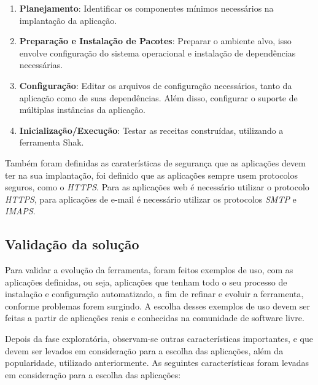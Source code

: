 \begin{enumerate}
  \item  \textbf{Planejamento}: Identificar os componentes mínimos necessários na implantação
 da aplicação.  
  \item  \textbf{Preparação e Instalação de Pacotes}: Preparar o ambiente alvo, 
isso envolve configuração do sistema operacional e instalação de dependências necessárias.
  \item  \textbf{Configuração}: Editar os arquivos de configuração necessários, tanto 
da aplicação como de suas dependências. Além disso, configurar o suporte de múltiplas instâncias
da aplicação.   
  \item  \textbf{Inicialização/Execução}: Testar as receitas construídas, utilizando
a ferramenta Shak. 
\end{enumerate}

Também foram definidas as caraterísticas de segurança que as aplicações devem 
ter na  sua implantação, foi 
definido que as aplicações sempre usem protocolos 
seguros, como o \textit{HTTPS}. 
Para as aplicações web é necessário utilizar o protocolo \textit{HTTPS}, para aplicações
de e-mail é necessário utilizar os protocolos \textit{SMTP} e \textit{IMAPS}.

\subsection{Validação da solução}
\label{subsection:validacao}

Para validar a evolução da ferramenta, foram feitos exemplos de uso,
com as aplicações definidas, ou seja, aplicações que tenham todo o seu 
processo de instalação e configuração automatizado, a
fim de refinar e evoluir a ferramenta, conforme problemas forem surgindo. A escolha
desses exemplos de uso devem ser feitas a partir de aplicações reais e
conhecidas na comunidade de software livre. 

Depois da fase exploratória, observam-se outras características importantes, e que 
devem ser levados em consideração para a escolha das aplicações, além da 
popularidade, utilizado anteriormente. As seguintes 
características foram levadas em consideração para a escolha das aplicações:

